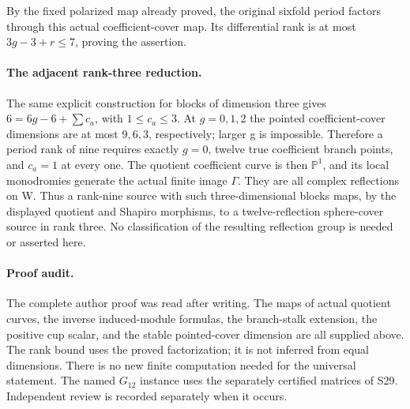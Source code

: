 By the fixed polarized map already proved, the original sixfold
period factors through this actual coefficient-cover map. Its
differential rank is at most \(3g-3+r\le7\), proving the
assertion.

\paragraph{The adjacent rank-three reduction.}
The same explicit construction for blocks of dimension three gives
\(6=6g-6+\sum c_a\), with \(1\le c_a\le3\).
At \(g=0,1,2\) the pointed coefficient-cover dimensions are at
most \(9,6,3\), respectively; larger g is impossible. Therefore
a period rank of nine requires exactly \(g=0\), twelve true
coefficient branch points, and \(c_a=1\) at every one.
The quotient coefficient curve is then \(\mathbb P^1\), and
its local monodromies generate the actual finite image \(\Gamma\).
They are all complex reflections on W. Thus a rank-nine source with
such three-dimensional blocks maps, by the displayed quotient and
Shapiro morphisms, to a twelve-reflection sphere-cover source in
rank three. No classification of the resulting reflection group is
needed or asserted here.

\paragraph{Proof audit.}
The complete author proof was read after writing. The maps of actual
quotient curves, the inverse induced-module formulas, the branch-stalk
extension, the positive cup scalar, and the stable pointed-cover
dimension are all supplied above. The rank bound uses the proved
factorization; it is not inferred from equal dimensions. There is no
new finite computation needed for the universal statement. The named
\(G_{12}\) instance uses the separately certified matrices of S29.
Independent review is recorded separately when it occurs.

